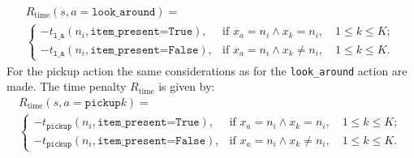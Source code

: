 \begin{multline}
    R_\text{time}(s, a=\texttt{look\_around}) = \\\begin{cases}
    -t_\texttt{l\_a}(n_i, \texttt{item\_present=True}), & \text{if }x_a=n_i \land x_k=n_i, \quad 1\leq k \leq K;\\
    -t_\texttt{l\_a}(n_i, \texttt{item\_present=False}), & \text{if }x_a=n_i \land x_k \neq n_i,\quad  1\leq k \leq K.
    \end{cases}
\end{multline}
For the pickup action  the same considerations as for the \texttt{look\_around} action are made. The time penalty $R_\text{time}$ is given by:
\begin{multline}
    R_\text{time}(s, a=\texttt{pickup}k) = \\ \begin{cases}
    -t_\texttt{pickup}(n_i, \texttt{item\_present=True}), & \text{if }x_a=n_i \land x_k=n_i, \quad 1\leq k \leq K;\\
    -t_\texttt{pickup}(n_i, \texttt{item\_present=False}), & \text{if }x_a=n_i \land x_k \neq n_i,\quad  1\leq k \leq K.
    \end{cases}
\end{multline}



